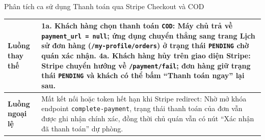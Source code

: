 \documentclass{uetgraduation}
\begin{document}
\begin{table}[!htbp]{Phân tích ca sử dụng Thanh toán qua Stripe Checkout và COD}
\begin{tabularx}{\textwidth}{|l|>{\raggedright\arraybackslash}X|}
\textbf{Luồng thay thế} & 
1a. Khách hàng chọn thanh toán \texttt{COD}: Máy chủ trả về \texttt{payment\_url = null}; ứng dụng chuyển thẳng sang trang Lịch sử đơn hàng (\texttt{/my-profile/orders}) ở trạng thái \texttt{PENDING} chờ quán xác nhận.\newline
4a. Khách hàng hủy trên giao diện Stripe: Stripe chuyển hướng về \texttt{/payment/fail}; đơn hàng giữ trạng thái \texttt{PENDING} và khách có thể bấm ``Thanh toán ngay'' lại sau. \\ \hline
\textbf{Luồng ngoại lệ} & 
Mất kết nối hoặc token hết hạn khi Stripe redirect: Nhờ mở khóa endpoint \texttt{complete-payment}, trạng thái thanh toán của đơn vẫn được ghi nhận chính xác, đồng thời chủ quán vẫn có nút ``Xác nhận đã thanh toán'' dự phòng. \\ \hline
\end{tabularx}
\end{table}

\clearpage
\end{document}
